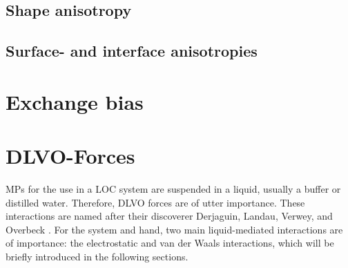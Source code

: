 \subsection{Shape anisotropy}
\subsection{Surface- and interface anisotropies}


\section{Exchange bias}\label{sec:theory_exchange_bias}

\section{DLVO-Forces}\label{sec:theory_dlvo}
\acp{MP} for the use in a \ac{LOC} system are suspended in a liquid, usually a buffer or distilled water. 
Therefore, \ac{DLVO} forces are of utter importance\cite{Shubbak2026}.
These interactions are named after their discoverer Derjaguin, Landau, Verwey, and Overbeck \cite{Derjaguin1941, Verwey1947, WirixSpeetjens2005}. 
For the system and hand, two main liquid-mediated interactions are of importance: the electrostatic and van der Waals interactions, which will be briefly introduced in the following sections. 

